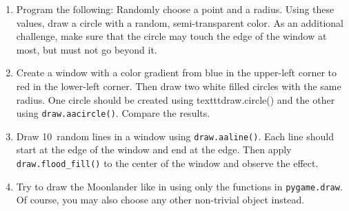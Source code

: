 \begin{enumerate}
	\item Program the following: Randomly choose a point and a radius. Using these values, draw a circle with a random, semi-transparent color. As an additional challenge, make sure that the circle may touch the edge of the window at most, but must not go beyond it.

	\item Create a window with a color gradient from blue in the upper-left corner 	to red in the lower-left corner. Then draw two white filled circles with the same radius. One circle should be created using texttt{draw.circle()} and the other using \texttt{draw.aacircle()}. 	Compare the results.
	
	\item Draw 10~random lines in a window using \texttt{draw.aaline()}. Each line should start at the edge of the window and end at the edge.	Then apply \texttt{draw.flood\_fill()}	to the center of the window and observe the effect.
	
	\item Try to draw the Moonlander like in  using only the functions in \texttt{pygame.\-draw}. Of course, you may also choose any other non-trivial object instead.
\end{enumerate}


